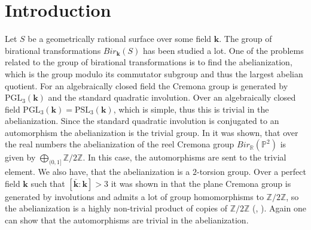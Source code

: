 \documentclass[12pt, oneside, reqno]{amsart}
\begin{document}
\section{Introduction}
\noindent
Let $S$ be a geometrically rational surface over some field $\textbf{k}$. The group of birational transformations $Bir_{\textbf{k}}(S)$ has been studied a lot. One of the problems related to the group of birational transformations is to find the abelianization, which is the group modulo its commutator subgroup and thus the largest abelian quotient. For an algebraically closed field the Cremona group is generated by $\textrm{PGL}_3(\textbf{k})$ and the standard quadratic involution. Over an algebraically closed field $\textrm{PGL}_3(\textbf{k}) = \textrm{PSL}_3(\textbf{k})$, which is simple, thus this is trivial in the abelianization. Since the standard quadratic involution is conjugated to an automorphism the abelianization is the trivial group. In \cite{Zimmermann_2018} it was shown, that over the real numbers the abelianization of the reel Cremona group $Bir_{\mathbb{R}}(\mathbb{P}^2)$ is given by $\bigoplus_{(0,1]} \mathbb{Z}/2\mathbb{Z}$. In this case, the automorphisms are sent to the trivial element. We also have, that the abelianization is a $2$-torsion group. Over a perfect field $\textbf{k}$ such that $[\bar{\textbf{k}}:\textbf{k}] > 3$ it was shown in \cite{LamySchneider_2024} that the plane Cremona group is generated by involutions and admits a lot of group homomorphisms to $\mathbb{Z} / 2 \mathbb{Z}$, so the abelianization is a highly non-trivial product of copies of $\mathbb{Z}/2 \mathbb{Z}$ (\cite{Lamy_2020}, \cite{LamySchneider_2024}). Again one can show that the automorphisms are trivial in the abelianization.
\end{document}
